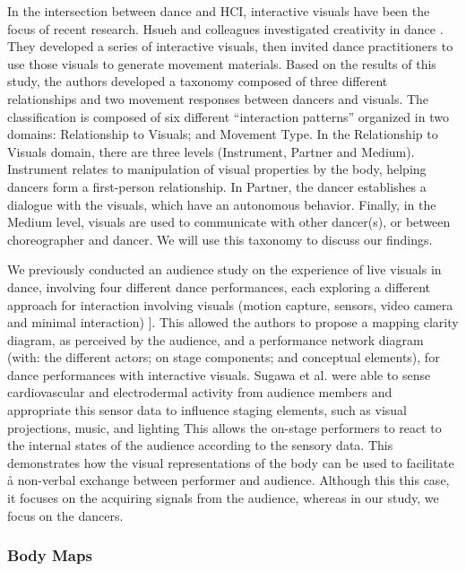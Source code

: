 In the intersection between dance and HCI, interactive visuals have been the focus of recent research. Hsueh and colleagues investigated creativity in dance \cite{hsueh_understanding_2019}. They developed a series of interactive visuals, then invited dance practitioners to use those visuals to generate movement materials. Based on the results of this study, the authors developed a taxonomy composed of three different relationships and two movement responses between dancers and visuals. The classification is composed of six different “interaction patterns” organized in two domains: Relationship to Visuals; and Movement Type. In the Relationship to Visuals domain, there are three levels (Instrument, Partner and Medium). Instrument relates to manipulation of visual properties by the body, helping dancers form a first-person relationship. In Partner, the dancer establishes a dialogue with the visuals, which have an autonomous behavior. Finally, in the Medium level, visuals are used to communicate with other dancer(s), or between choreographer and dancer. We will use this taxonomy to discuss our findings.

We previously conducted an audience study on the experience of live visuals in dance, involving four different dance performances, each exploring a different approach for interaction involving visuals (motion capture, sensors, video camera and minimal interaction) \cite{correia_connected_2021}]. This allowed the authors to propose a mapping clarity diagram, as perceived by the audience, and a performance network diagram (with: the different actors; on stage components; and conceptual elements), for dance performances with interactive visuals. Sugawa et al. were able to sense cardiovascular and electrodermal activity from audience members and appropriate this sensor data to influence staging elements, such as visual projections, music, and lighting \cite{sugawa_boiling_2021} This allows the on-stage performers to react to the internal states of the audience according to the sensory data. This demonstrates how the visual representations of the body can be used to facilitate å non-verbal exchange between performer and audience. Although this this case, it focuses on the acquiring signals from the audience, whereas in our study, we focus on the dancers.

\subsubsection{Body Maps}

